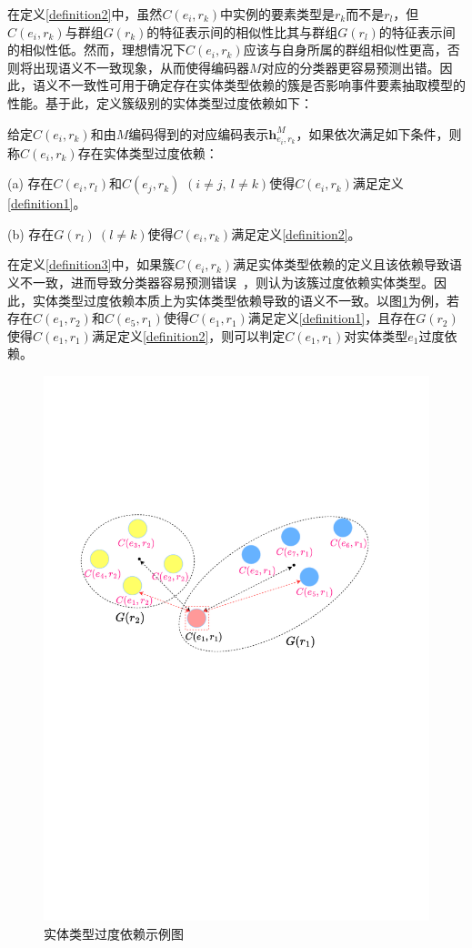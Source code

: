 在定义\ref{definition2}中，虽然$C(e_{i}, r_{k})$中实例的要素类型是$r_{k}$而不是$r_{l}$，但$C(e_{i}, r_{k})$与群组$G(r_{k})$的特征表示间的相似性比其与群组$G(r_{l})$的特征表示间的相似性低。然而，理想情况下$C(e_{i}, r_{k})$应该与自身所属的群组相似性更高，否则将出现语义不一致现象，从而使得编码器$M$对应的分类器更容易预测出错。因此，语义不一致性可用于确定存在实体类型依赖的簇是否影响事件要素抽取模型的性能。基于此，定义簇级别的实体类型过度依赖如下：
\begin{definition}[实体类型过度依赖]
\label{definition3}
给定$C(e_{i}, r_{k})$和由$M$编码得到的对应编码表示$\boldsymbol{h}_{e_{i}, r_{k}}^{M}$，如果依次满足如下条件，则称$C(e_{i}, r_{k})$存在实体类型过度依赖：

(a) 存在$C(e_{i}, r_{l})$和$C(e_{j}, r_{k})$ $(i \neq j,\ l \neq k)$使得$C(e_{i}, r_{k})$满足定义\ref{definition1}。

(b) 存在$G(r_{l})\ (l \neq k)$使得$C(e_{i}, r_{k})$满足定义\ref{definition2}。
\end{definition}

在定义\ref{definition3}中，如果簇$C(e_{i}, r_{k})$满足实体类型依赖的定义且该依赖导致语义不一致，进而导致分类器容易预测错误~\cite{ohashi2020text}，则认为该簇过度依赖实体类型。因此，实体类型过度依赖本质上为实体类型依赖导致的语义不一致。以图\ref{fig-overdependence}为例，若存在$C(e_{1}, r_{2})$和$C(e_{5}, r_{1})$使得$C(e_{1}, r_{1})$满足定义\ref{definition1}，且存在$G(r_{2})$使得$C(e_{1}, r_{1})$满足定义\ref{definition2}，则可以判定$C(e_{1}, r_{1})$对实体类型$e_{1}$过度依赖。

\begin{figure}[htp]
    \centering
   \includegraphics[width=0.7\linewidth]{figures/chap4/overdependence.pdf}
   \caption{实体类型过度依赖示例图}
   \label{fig-overdependence}
\end{figure}

